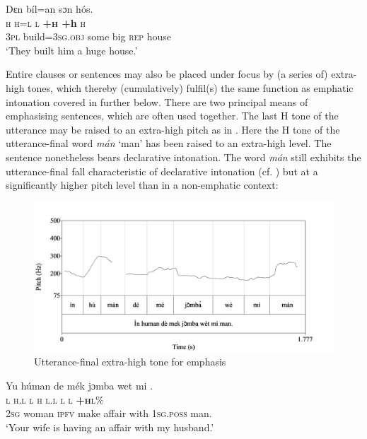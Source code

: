 \ea%
    \label{ex:key:63}
    \glll   Dɛn    bíl=an    sɔn          hós.\\
\textsc{h}    \textsc{h=l}      \textsc{l}    \textbf{\textsc{+h}  \textbf{+h}}    \textsc{h}\\
\textsc{3pl}    build=\textsc{3sg.obj}  some  big  \textsc{rep}    house\\
\glt ‘They built him a huge house.’    
\z

Entire clauses or sentences may also be placed under focus  by (a series of) extra-high tones, which thereby (cumulatively) fulfil(s) the same function as emphatic intonation covered in  further below. There are two principal means of emphasising sentences, which are often used together. The last H tone of the utterance may be raised to an extra-high pitch as in . Here the H tone of the utterance-final word \textit{mán} ‘man’ has been raised to an extra-high level. The sentence nonetheless bears declarative intonation. The word \textit{mán} still exhibits the utterance-final fall characteristic of declarative intonation (cf. ) but at a significantly higher pitch level than in a non-emphatic context:

\begin{figure}
\caption{Utterance-final extra-high tone for emphasis}
\label{fig:key:3.25}
\includegraphics[height=.3\textheight]{figures/yakpomod-img27.png}
\end{figure}
 


\ea%
    \label{ex:key:64}
    \glll   Yu  húman  de  mék    jɔmba  wet  mi    .\\
\textsc{l}  \textsc{h.l}    \textsc{l}  \textsc{h}    \textsc{l.l}    \textsc{l}  \textsc{l}    \textbf{\textsc{+h}}\textsc{l\%}\\
\textsc{2sg}  woman  \textsc{ipfv}  make  affair  with  \textsc{1sg.poss}  man.\\
\glt ‘Your wife is having an affair with my husband.’
\z

